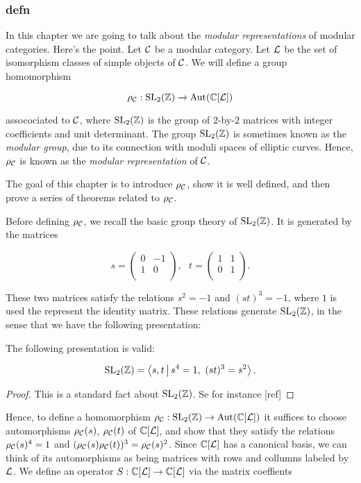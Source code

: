 \subsubsection{defn}

In this chapter we are going to talk about the \textit{modular representations} of modular categories. Here's the point. Let ${\mathcal C}$ be a modular category. Let ${\mathcal L}$ be the set of isomorphism classes of simple objects of ${\mathcal C}$. We will define a group homomorphism

$$\rho_{{\mathcal C}}:\operatorname{SL}_2({\mathbb Z})\xrightarrow{}\operatorname{Aut}({\mathbb C}[{\mathcal L}])$$

assocociated to ${\mathcal C}$, where $\operatorname{SL}_2({\mathbb Z})$ is the group of $2$-by-$2$ matrices with integer coefficients and unit determinant. The group $\operatorname{SL}_2({\mathbb Z})$ is sometimes known as the \textit{modular group}, due to its connection with moduli spaces of elliptic curves. Hence, $\rho_{{\mathcal C}}$ is known as the \textit{modular representation} of ${\mathcal C}$.

The goal of this chapter is to introduce $\rho_{{\mathcal C}}$, show it is well defined, and then prove a series of theorems related to $\rho_{{\mathcal C}}$.

Before defining $\rho_{{\mathcal C}}$, we recall the basic group theory of $\operatorname{SL}_2({\mathbb Z})$. It is generated by the matrices

$$
s=
\begin{pmatrix}
0 & -1 \\
1 & 0 \\
\end{pmatrix},
\,\,\,\,
t=
\begin{pmatrix}
1 & 1 \\
0 & 1 \\
\end{pmatrix}.
$$

These two matrices satisfy the relations $s^2=-1$ and $(st)^3=-1$, where $1$ is used the represent the identity matrix. These relations generate $\operatorname{SL}_2({\mathbb Z})$, in the sense that we have the following presentation:

\begin{prop} The following presentation is valid:

$$\operatorname{SL}_2({\mathbb Z})=\Braket{s,t | s^4=1,\,\, (st)^3=s^2}.$$
\end{prop}
\begin{proof} This is a standard fact about $\operatorname{SL}_2({\mathbb Z})$. Se for instance [ref]
\end{proof}

Hence, to define a homomorphism $\rho_{{\mathcal C}}:\operatorname{SL}_2({\mathbb Z})\to \operatorname{Aut}({\mathbb C}[{\mathcal L}])$ it suffices to choose automorphisms $\rho_{{\mathcal C}}(s)$, $\rho_{{\mathcal C}}(t)$ of ${\mathbb C}[{\mathcal L}]$, and show that they satisfy the relations $\rho_{{\mathcal C}}(s)^4=1$ and $(\rho_{{\mathcal C}}(s)\rho_{{\mathcal C}}(t))^3=\rho_{{\mathcal C}}(s)^2$. Since ${\mathbb C}[{\mathcal L}]$ has a canonical basis, we can think of its automorphisms as being matrices with rows and collumns labeled by ${\mathcal L}$. We define an operator $S:{\mathbb C}[{\mathcal L}]\to {\mathbb C}[{\mathcal L}]$ via the matrix coeffients

